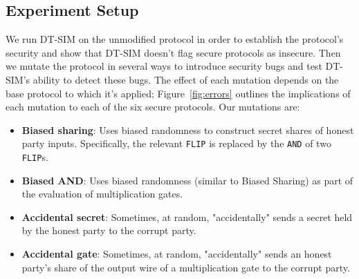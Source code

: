 \documentclass[acmlarge, manuscript, screen, review, anonymous, table]{acmart}
\newcommand{\inlinecode}[2][cho]{\lstinline[language=#1]{#2}}
\newcommand{\toolname}{\textsc{DT-SIM}\xspace}
\begin{document}
\subsection{Experiment Setup}
\label{sec:e2-experiment-setup}

We run \toolname on the unmodified protocol in order to establish the protocol's security
and show that \toolname doesn't flag secure protocols as insecure.
Then we mutate the protocol in several ways to introduce security bugs and test \toolname's ability to detect these bugs.
The effect of each mutation depends on the base protocol to which it's applied;
Figure~\ref{fig:errors} outlines the implications of each mutation to each of the six secure protocols.
Our mutations are:
%
\begin{itemize}
\item \textbf{Biased sharing}: Uses biased randomness to construct secret shares of honest party inputs.
    Specifically, the relevant \inlinecode{FLIP} is replaced by the \inlinecode{AND} of two \inlinecode{FLIP}s.
\item \textbf{Biased AND}: Uses biased randomness (similar to Biased Sharing) as part of the evaluation of multiplication gates.
\item \textbf{Accidental secret}: Sometimes, at random, "accidentally" sends a secret held by the honest party to the corrupt party.
\item \textbf{Accidental gate}: Sometimes, at random, "accidentally" sends an honest party's share of the output wire
    of a multiplication gate to the corrupt party.
\end{itemize}
\end{document}
